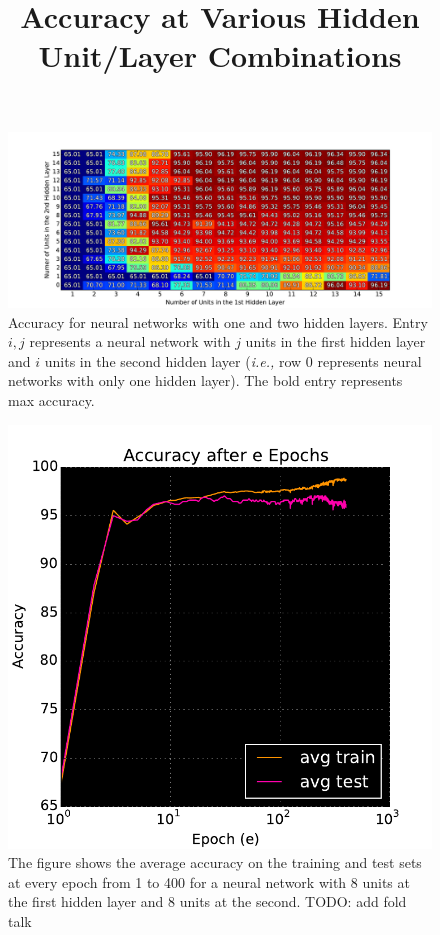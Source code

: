 \begin{figure}[t]
  \title{Accuracy at Various Hidden Unit/Layer Combinations}
\centering
\includegraphics[width=\textwidth]{figs/wbcd_table}
\caption {Accuracy for neural networks with one and two hidden layers. Entry \(i,j\) represents a neural network with \(j\) units in the first hidden layer and \(i\) units in the second hidden layer ({\em i.e.,} row 0 represents neural networks with only one hidden layer). The bold entry represents max accuracy.}
\label{fig:wbcd_table}

\end{figure}


\begin{figure}[t]

\centering
\includegraphics[width=0.95\columnwidth]{figs/wbcd_iterative}
\caption {The figure shows the average accuracy on the training and test sets at every epoch from 1 to 400 for a neural network with 8 units at the first hidden layer and 8 units at the second. TODO: add fold talk}
\label{fig:wbcd_iterative}

\end{figure}



